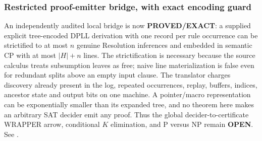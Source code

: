 \subsubsection*{Restricted proof-emitter bridge, with exact encoding guard}
An independently audited local bridge is now \textbf{PROVED/EXACT}: a
supplied explicit tree-encoded DPLL derivation with one record per rule
occurrence can be strictified to at most $n$ genuine Resolution inferences
and embedded in semantic CP with at most $|H|+n$ lines.  The strictification
is necessary because the source calculus treats subsumption leaves as free;
naive line materialization is false even for redundant splits above an empty
input clause.  The translator charges discovery already present in the log,
repeated occurrences, replay, buffers, indices, ancestor state and output
bits on one machine.  A pointer/macro representation can be exponentially
smaller than its expanded tree, and no theorem here makes an arbitrary SAT
decider emit any proof.  Thus the global decider-to-certificate WRAPPER arrow,
conditional $K$ elimination, and P versus NP remain \textbf{OPEN}.  See
.
